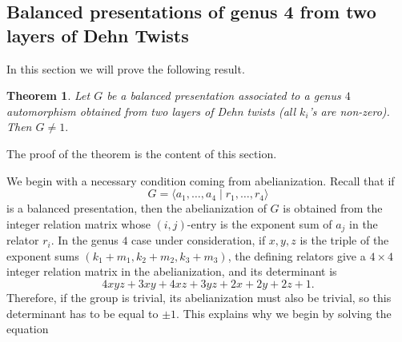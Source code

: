 \documentclass{article}
\newtheorem{theorem}{Theorem}[section]
\begin{document}
\subsection{Balanced presentations of genus 4 from two layers of Dehn Twists}
In this section we will prove the following result.
\begin{theorem}\label{thm:genus3-two-layers1}
Let \(G\) be a balanced presentation associated to a genus \(4\) automorphism
obtained from two layers of Dehn twists (all $k_i$'s are non-zero). Then
$G\neq 1.$ 
\end{theorem}
The proof of the   theorem is the content of this section.

We begin with a necessary condition coming from abelianization.  Recall that
if
\[
G=\langle a_1,\ldots,a_4\mid r_1,\ldots,r_4\rangle
\]
is a balanced presentation, then the abelianization of \(G\) is obtained from
the integer relation matrix whose \((i,j)\)-entry is the exponent sum of
\(a_j\) in the relator \(r_i\).  In the genus \(4\) case under
consideration, if $x,y,z$ is the triple of the exponent sums $(k_1+m_1,k_2+m_2, k_3+m_3)$, the defining relators give a \(4\times 4\) integer relation
matrix in the abelianization, and its determinant is
\[
4xyz+3xy+4xz+3yz+2x+2y+2z+1.
\]
Therefore, if the group is trivial, its abelianization must also be trivial,
so this determinant has to be equal to \(\pm 1\).  This explains why we begin
by solving the equation
\end{document}
